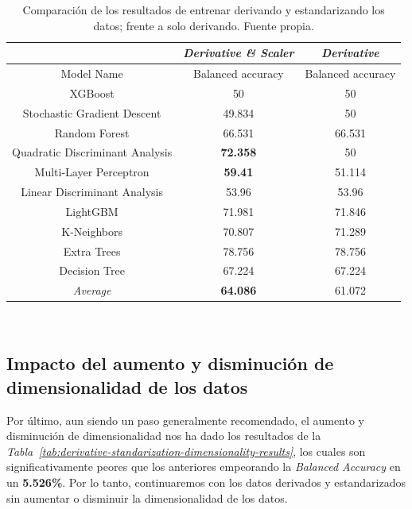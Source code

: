 \begin{table}[!h]
    \centering
    \begin{tabular}{|c|c|c|}
        \hline
        & \textit{Derivative \& Scaler} & \textit{Derivative} \\ \hline
        Model Name & Balanced accuracy & Balanced accuracy \\ \hline
        XGBoost & 50 & 50 \\
        Stochastic Gradient Descent & 49.834 & 50 \\ 
        Random Forest & 66.531 & 66.531 \\ 
        Quadratic Discriminant Analysis & \textbf{72.358} & 50 \\ 
        Multi-Layer Perceptron & \textbf{59.41} & 51.114 \\ 
        Linear Discriminant Analysis & 53.96 & 53.96 \\ 
        LightGBM & 71.981 & 71.846 \\ 
        K-Neighbors & 70.807 & 71.289 \\ 
        Extra Trees & 78.756 & 78.756 \\ 
        Decision Tree & 67.224 & 67.224 \\ \hline
        \textit{Average} & \textbf{64.086} & 61.072 \\ \hline
    \end{tabular}
    \caption{Comparación de los resultados de entrenar derivando y estandarizando los datos; frente a solo derivando. Fuente propia.}\ \label{tab:derivative-standarization-results}
\end{table}


\subsection{Impacto del aumento y disminución de dimensionalidad de los datos}


Por último, aun siendo un paso generalmente recomendado, el aumento y disminución de dimensionalidad nos ha dado los resultados de la \textit{Tabla\ \ref{tab:derivative-standarization-dimensionality-results}}, los cuales son significativamente peores que los anteriores empeorando la \textit{Balanced Accuracy} en un \textbf{5.526\%}. Por lo tanto, continuaremos con los datos derivados y estandarizados sin aumentar o disminuir la dimensionalidad de los datos.

